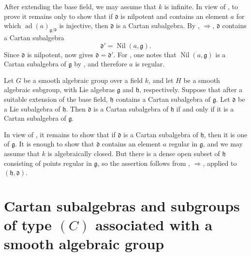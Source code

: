 After extending the base field, we may assume that \(k\) is infinite.
In view of , to prove  it remains only to show that if
\(\mathfrak d\) is nilpotent and contains an element \(a\) for which
\(\operatorname{ad}(a)_{\mathfrak g/\mathfrak d}\) is injective, then
\(\mathfrak d\) is a Cartan subalgebra. By ,
\(\Rightarrow\), \(\mathfrak d\) contains a Cartan subalgebra
\[
  \mathfrak d'=\operatorname{Nil}(a,\mathfrak g).
\]
Since \(\mathfrak d\) is nilpotent,  now gives
\(\mathfrak d=\mathfrak d'\). For , one notes that
\(\operatorname{Nil}(a,\mathfrak g)\) is a Cartan subalgebra of
\(\mathfrak g\) by , and therefore \(a\) is regular.

\begin{corollary}
Let \(G\) be a smooth algebraic group over a field \(k\), and let
\(H\) be a smooth algebraic subgroup, with Lie algebras
\(\mathfrak g\) and \(\mathfrak h\), respectively. Suppose that after
a suitable extension of the base field, \(\mathfrak h\) contains a
Cartan subalgebra of \(\mathfrak g\). Let \(\mathfrak d\) be a Lie
subalgebra of \(\mathfrak h\). Then \(\mathfrak d\) is a Cartan
subalgebra of \(\mathfrak h\) if and only if it is a Cartan subalgebra
of \(\mathfrak g\).
\end{corollary}

In view of , it remains to show that if \(\mathfrak d\) is a
Cartan subalgebra of \(\mathfrak h\), then it is one of
\(\mathfrak g\). It is enough to show that \(\mathfrak d\) contains
an element \(a\) regular in \(\mathfrak g\), and we may assume that
\(k\) is algebraically closed. But there is a dense open subset of
\(\mathfrak h\) consisting of points regular in \(\mathfrak g\), so
the assertion follows from ,
\(\Rightarrow\), applied to
\((\mathfrak h,\mathfrak d)\).

\section{Cartan subalgebras and subgroups of type \texorpdfstring{\((C)\)}{(C)}
associated with a smooth algebraic group}

